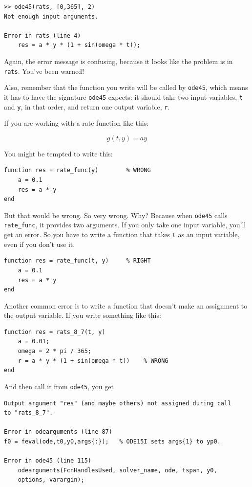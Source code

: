 \documentclass[
]{book}
\begin{document}
\begin{verbatim}
>> ode45(rats, [0,365], 2)
Not enough input arguments.

Error in rats (line 4)
    res = a * y * (1 + sin(omega * t));
\end{verbatim}

Again, the error message is confusing, because it looks like the problem
is in {\tt rats}.  You've been warned!

Also, remember that the function you write will be called by
{\tt ode45}, which means it has to have the signature {\tt ode45}
expects: it should take two input variables, {\tt t} and {\tt y},
in that order, and return one output variable, {\tt r}.

If you are working with a rate function like this:

\begin{equation}
g(t, y) = a y
\end{equation}

You might be tempted to write this:

\begin{verbatim}
function res = rate_func(y)        % WRONG
    a = 0.1
    res = a * y
end
\end{verbatim}

But that would be wrong.  So very wrong.  Why?  Because
when {\tt ode45} calls {\tt rate\_func}, it provides two arguments.
If you only take one input variable, you'll get an error.  So
you have to write a function that takes {\tt t} as an input
variable, even if you don't use it.

\begin{verbatim}
function res = rate_func(t, y)     % RIGHT
    a = 0.1
    res = a * y
end
\end{verbatim}

Another common error is to write a function that doesn't make
an assignment to the output variable.  If you write something
like this:

\begin{verbatim}
function res = rats_8_7(t, y)
    a = 0.01;
    omega = 2 * pi / 365;
    r = a * y * (1 + sin(omega * t))    % WRONG
end
\end{verbatim}

And then call it from {\tt ode45}, you get

\begin{verbatim}
Output argument "res" (and maybe others) not assigned during call
to "rats_8_7".

Error in odearguments (line 87)
f0 = feval(ode,t0,y0,args{:});   % ODE15I sets args{1} to yp0.

Error in ode45 (line 115)
    odearguments(FcnHandlesUsed, solver_name, ode, tspan, y0,
    options, varargin);
\end{verbatim}
\end{document}
